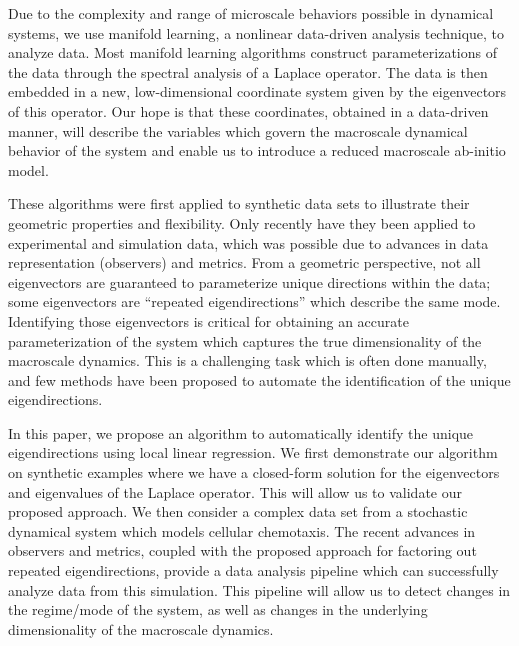 \documentclass[preprint]{elsarticle}
\begin{document}
%

Due to the complexity and range of microscale behaviors possible in dynamical systems, we use manifold learning, a nonlinear data-driven analysis technique, to analyze data.
%
Most manifold learning algorithms \cite{...} construct parameterizations of the data through the spectral analysis of a Laplace operator.
%
The data is then embedded in a new, low-dimensional coordinate system given by the eigenvectors of this operator. 
%
Our hope is that these coordinates, obtained in a data-driven manner, will describe the variables which govern the macroscale dynamical behavior of the system and enable us to introduce a reduced macroscale ab-initio model. 

These algorithms were first applied to synthetic data sets to illustrate their geometric properties and flexibility. 
%
Only recently have they been applied to experimental and simulation data, which was possible due to advances in data representation (observers) and metrics. 
%
From a geometric perspective, not all eigenvectors are guaranteed to parameterize unique directions within the data; some eigenvectors are 	``repeated eigendirections'' which describe the same mode. 
%
Identifying those eigenvectors is critical for obtaining an accurate parameterization of the system which captures the true dimensionality of the macroscale dynamics.  
%
This is a challenging task which is often done manually, and few methods have been proposed to automate the identification of the unique eigendirections. 

In this paper, we propose an algorithm to automatically identify the unique eigendirections using local linear regression.
%
We first demonstrate our algorithm on synthetic examples where we have a closed-form solution for the eigenvectors and eigenvalues of the Laplace operator.  
%
This will allow us to validate our proposed approach.
%
We then consider a complex data set from a stochastic dynamical system which models cellular chemotaxis. 
%
The recent advances in observers and metrics, coupled with the proposed approach for factoring out repeated eigendirections, provide a data analysis pipeline which can successfully analyze data from this simulation.
%
This pipeline will allow us to detect changes in the regime/mode of the system, as well as changes in the underlying dimensionality of the macroscale dynamics.  
\end{document}
